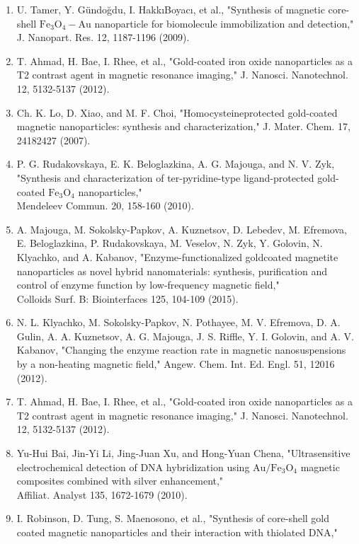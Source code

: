 \documentclass[12pt, a4paper]{article}
\begin{document}
\begin{enumerate}
  \item U. Tamer, Y. Gündoğdu, I. HakkıBoyacı, et al., "Synthesis of magnetic core-shell \(\mathrm{Fe}_{3} \mathrm{O}_{4}-\mathrm{Au}\) nanoparticle for biomolecule immobilization and detection," J. Nanopart. Res. 12, 1187-1196 (2009).
  \item T. Ahmad, H. Bae, I. Rhee, et al., "Gold-coated iron oxide nanoparticles as a T2 contrast agent in magnetic resonance imaging," J. Nanosci. Nanotechnol. 12, 5132-5137 (2012).
  \item Ch. K. Lo, D. Xiao, and M. F. Choi, "Homocysteineprotected gold-coated magnetic nanoparticles: synthesis and characterization," J. Mater. Chem. 17, 24182427 (2007).
  \item P. G. Rudakovskaya, E. K. Beloglazkina, A. G. Majouga, and N. V. Zyk, "Synthesis and characterization of ter-pyridine-type ligand-protected gold-coated \(\mathrm{Fe}_{3} \mathrm{O}_{4}\) nanoparticles," \\
  Mendeleev Commun. 20, 158-160 (2010).
  \item A. Majouga, M. Sokolsky-Papkov, A. Kuznetsov, D. Lebedev, M. Efremova, E. Beloglazkina, P. Rudakovskaya, M. Veselov, N. Zyk, Y. Golovin, N. Klyachko, and A. Kabanov, "Enzyme-functionalized goldcoated magnetite nanoparticles as novel hybrid nanomaterials: synthesis, purification and control of enzyme function by low-frequency magnetic field," \\
  Colloids Surf. B: Biointerfaces 125, 104-109 (2015).
  \item N. L. Klyachko, M. Sokolsky-Papkov, N. Pothayee, M. V. Efremova, D. A. Gulin, A. A. Kuznetsov, A. G. Majouga, J. S. Riffle, Y. I. Golovin, and A. V. Kabanov, "Changing the enzyme reaction rate in magnetic nanosuspensions by a non-heating magnetic field," Angew. Chem. Int. Ed. Engl. 51, 12016 (2012).
  \item T. Ahmad, H. Bae, I. Rhee, et al., "Gold-coated iron oxide nanoparticles as a T2 contrast agent in magnetic resonance imaging," J. Nanosci. Nanotechnol. 12, 5132-5137 (2012).
  \item Yu-Hui Bai, Jin-Yi Li, Jing-Juan Xu, and Hong-Yuan Chena, "Ultrasensitive electrochemical detection of DNA hybridization using \(\mathrm{Au} / \mathrm{Fe}_{3} \mathrm{O}_{4}\) magnetic composites combined with silver enhancement," \\
  Affiliat. Analyst 135, 1672-1679 (2010).
  \item I. Robinson, D. Tung, S. Maenosono, et al., "Synthesis of core-shell gold coated magnetic nanoparticles and their interaction with thiolated DNA," \\

\end{enumerate}
\end{document}

